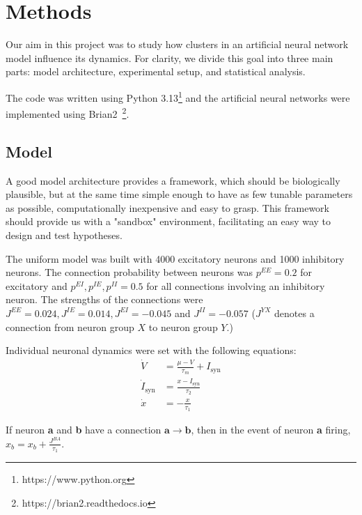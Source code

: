 \section{Methods}
\label{sec:methods}

Our aim in this project was to study how clusters in an artificial neural network model influence its dynamics. For clarity, we divide this goal into three main parts: model architecture, experimental setup, and statistical analysis.

The code was written using Python 3.13\footnote{https://www.python.org} and the artificial neural networks were implemented using Brian2~\citep{stimberg2019brian2}\footnote{https://brian2.readthedocs.io}.


\subsection{Model}
\label{sec:model}

A good model architecture provides a framework, which should be biologically plausible, but at the same time simple enough to have as few tunable parameters as possible, computationally inexpensive and easy to grasp. This framework should provide us with a "sandbox" environment, facilitating an easy way to design and test hypotheses.

The uniform model was built with 4000 excitatory neurons and 1000 inhibitory neurons. The connection probability between neurons was $p^{EE} = 0.2$ for excitatory and $p^{EI}, p^{IE}, p^{II} = 0.5$ for all connections involving an inhibitory neuron. 
The strengths of the connections were $J^{EE} = 0.024, J^{IE} = 0.014, J^{EI} = -0.045$ and $J^{II} = -0.057$ ($J^{YX}$ denotes a connection from neuron group $X$ to neuron group $Y$.)


Individual neuronal dynamics were set with the following equations:
\begin{align}
\dot V &= \frac{\mu - V}{\tau_m} + I_{\text{syn}}
\label{eq:membrane_voltage} \\
\dot I_{\text{syn}} &= \frac{x - I_{\text{syn}}}{\tau_2}
\label{eq:synaptic_current_dynamics} \\
\dot x &= -\frac{x}{\tau_1}
\label{eq:auxiliary_variable}
\end{align}

If neuron \textbf{a} and \textbf{b} have a connection $\mathbf{a} \to \mathbf{b}$, then in the event of neuron \textbf{a} firing, $x_b = x_b + \frac{J^{BA}}{\tau_1}$.

